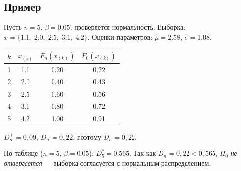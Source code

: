 \subsection*{Пример}

Пусть $n = 5$, $\beta = 0.05$, проверяется нормальность.
Выборка: $x = \{1.1,\; 2.0,\; 2.5,\; 3.1,\; 4.2\}$.
Оценки параметров: $\hat{\mu}=2.58$, $\hat{\sigma}=1.08$.

\medskip
\noindent
\begin{tabular}{cccc}
  \hline
  $k$ & $x_{(k)}$ & $F_n(x_{(k)})$ & $F_0(x_{(k)})$ \\
  \hline
  1 & 1.1 & 0.20 & 0.22 \\
  2 & 2.0 & 0.40 & 0.43 \\
  3 & 2.5 & 0.60 & 0.56 \\
  4 & 3.1 & 0.80 & 0.72 \\
  5 & 4.2 & 1.00 & 0.91 \\
  \hline
\end{tabular}

\medskip
$D_n^+ = 0{,}09$, $D_n^- = 0{,}22$, поэтому $D_n = 0{,}22$.

По таблице ($n=5$, $\beta=0.05$): $D_5^* = 0.565$.
Так как $D_n = 0{,}22 < 0{,}565$, $H_0$ \emph{не отвергается} — выборка согласуется с нормальным распределением.

\clearpage
